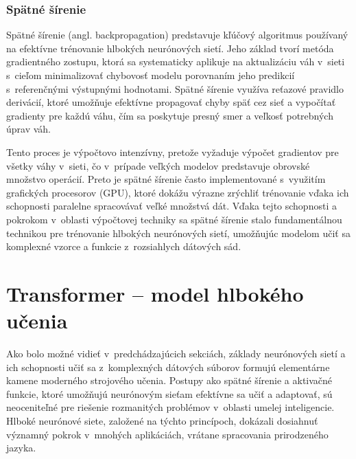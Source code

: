 
\subsection{Spätné šírenie}

Spätné šírenie (angl. backpropagation) predstavuje kľúčový algoritmus používaný na efektívne trénovanie hlbokých neurónových sietí. Jeho základ tvorí metóda gradientného zostupu, ktorá sa systematicky aplikuje na aktualizáciu váh v~sieti s~cieľom minimalizovať chybovosť modelu porovnaním jeho predikcií s~referenčnými výstupnými hodnotami. Spätné šírenie využíva reťazové pravidlo derivácií, ktoré umožňuje efektívne propagovať chyby späť cez sieť a vypočítať gradienty pre každú váhu, čím sa poskytuje presný smer a veľkosť potrebných úprav váh.

Tento proces je výpočtovo intenzívny, pretože vyžaduje výpočet gradientov pre všetky váhy v~sieti, čo v~prípade veľkých modelov predstavuje obrovské množstvo operácií. Preto je spätné šírenie často implementované s~využitím grafických procesorov (GPU), ktoré dokážu výrazne zrýchliť trénovanie vďaka ich schopnosti paralelne spracovávať veľké množstvá dát. Vďaka tejto schopnosti a pokrokom v~oblasti výpočtovej techniky sa spätné šírenie stalo fundamentálnou technikou pre trénovanie hlbokých neurónových sietí, umožňujúc modelom učiť sa komplexné vzorce a funkcie z~rozsiahlych dátových sád.

\chapter{Transformer -- model hlbokého učenia}\label{chap:transformer}

Ako bolo možné vidieť v~predchádzajúcich sekciách, základy neurónových sietí a ich schopnosti učiť sa z~komplexných dátových súborov formujú elementárne kamene moderného strojového učenia. Postupy ako spätné šírenie a aktivačné funkcie, ktoré umožňujú neurónovým sieťam efektívne sa učiť a adaptovať, sú neoceniteľné pre riešenie rozmanitých problémov v~oblasti umelej inteligencie. Hlboké neurónové siete, založené na týchto princípoch, dokázali dosiahnuť významný pokrok v~mnohých aplikáciách, vrátane spracovania prirodzeného jazyka.

